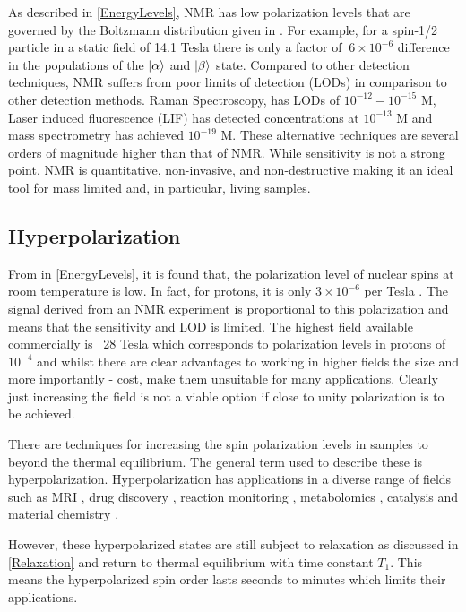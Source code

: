 As described in \ref{EnergyLevels}, NMR has low polarization levels that are governed by the Boltzmann
distribution given in . For example, for a spin-1/2 particle in a static field of 14.1 Tesla
there is only a factor of $~6\times10^{-6}$ difference in the populations of the $\ket{\alpha}$ and $\ket{\beta}$ state.
Compared to other detection techniques, NMR suffers from poor limits of detection (LODs)
in comparison to other detection methods. Raman Spectroscopy, has
LODs of $10^{-12} - 10^{-15}$ M, Laser induced fluorescence (LIF) has detected concentrations at $10^{-13}$ M and
mass spectrometry has achieved $10^{-19}$ M. These alternative techniques are several orders of magnitude higher than that of NMR.
While sensitivity is not a strong point, NMR is quantitative, non-invasive, and non-destructive making it an ideal
tool for mass limited and, in particular, living samples.

\subsection{Hyperpolarization}

 From  in \ref{EnergyLevels}, it is found that, the polarization level of nuclear spins at room temperature is low. In fact,
 for protons, it is only $3\times10^{-6}$ per Tesla \citep{RN138}. The signal derived from an NMR experiment
 is proportional to this polarization and means that the sensitivity and LOD is limited. The highest
 field available commercially is ~28 Tesla which corresponds to polarization levels in protons of ~$10^{-4}$ and
 whilst there are clear advantages to working in higher fields the size and more importantly - cost, make them
 unsuitable for many applications. Clearly just increasing the field is not a viable
 option if close to unity polarization is to be
 achieved.

 There are techniques for increasing the spin polarization levels in samples to beyond the thermal
 equilibrium. The general term used to describe these is hyperpolarization. Hyperpolarization has
 applications in a diverse range of fields such as MRI \citep{RN139,RN140,RN151,RN152}, drug discovery
 \citep{RN141,RN142}, reaction monitoring \citep{RN143,RN144,RN145}, metabolomics \citep{RN147,RN148},
 catalysis\citep{RN149, RN150} and material chemistry \citep{RN153,piveteau2015structure,RN154}.

 However, these hyperpolarized states are still subject to relaxation as discussed in \ref{Relaxation} and
 return to thermal equilibrium with time constant $T_1$. This means the hyperpolarized spin order lasts seconds
 to minutes which limits their applications.


